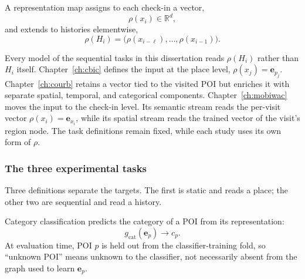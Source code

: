 \begin{definition}\label{def:fund:repmap}
    A representation map assigns to each check-in a vector,
    \begin{equation}
        \rho(x_i)\in\mathbb{R}^{d},
    \end{equation}
    and extends to histories elementwise,
    \begin{equation}
        \rho(H_i)=\bigl(\rho(x_{i-\ell}),\ldots,\rho(x_{i-1})\bigr).
    \end{equation}
\end{definition}

Every model of the sequential tasks in this dissertation reads $\rho(H_i)$ rather than
$H_i$ itself. Chapter~\ref{ch:cbic} defines the input at the place level,
$\rho(x_j)=\mathbf{e}_{p_j}$. Chapter~\ref{ch:courb} retains a vector tied to the visited
POI but enriches it with separate spatial, temporal, and categorical components.
Chapter~\ref{ch:mobiwac} moves the input to the check-in level. Its semantic stream reads
the per-visit vector $\rho(x_i)=\mathbf{e}_{x_i}$, while its spatial stream reads the
trained vector of the visit's region node. The task definitions remain fixed, while
each study uses its own form of $\rho$.

\subsubsection{The three experimental tasks}

Three definitions separate the targets. The first is static and reads a place; the
other two are sequential and read a history.

\begin{definition}\label{def:fund:catclf}
    Category classification predicts the category of a POI from its representation:
    \begin{equation}
        g_{\mathrm{cat}}(\mathbf{e}_p)\longrightarrow c_p.
    \end{equation}
    At evaluation time, POI $p$ is held out from the classifier-training fold, so
    ``unknown POI'' means unknown to the classifier, not necessarily absent from the graph
    used to learn $\mathbf{e}_p$.
\end{definition}

